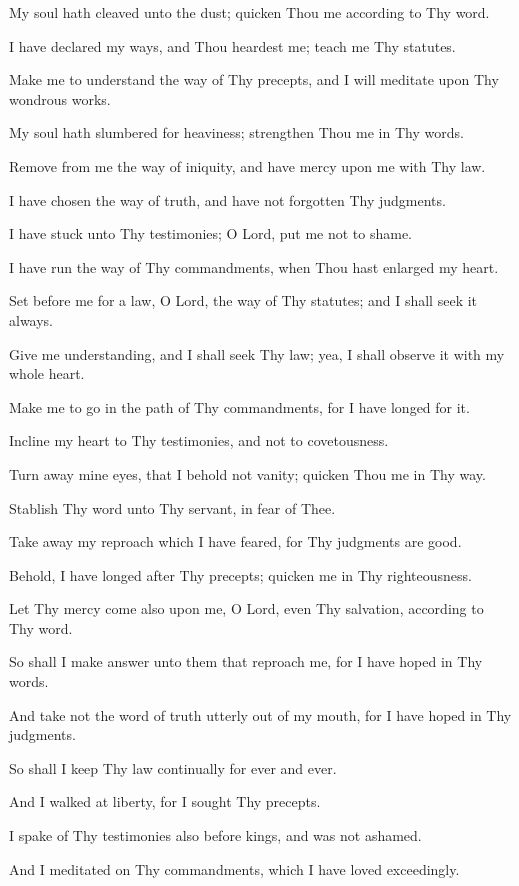 My soul hath cleaved unto the dust; quicken Thou me
according to Thy word.

I have declared my ways, and Thou heardest me; teach me
Thy statutes.

Make me to understand the way of Thy precepts, and I will
meditate upon Thy wondrous works.

My soul hath slumbered for heaviness; strengthen Thou me in
Thy words.

Remove from me the way of iniquity, and have mercy upon me
with Thy law.

I have chosen the way of truth, and have not forgotten Thy
judgments.

I have stuck unto Thy testimonies; O Lord, put me not to
shame.

I have run the way of Thy commandments, when Thou hast
enlarged my heart.

Set before me for a law, O Lord, the way of Thy statutes; and I
shall seek it always.

Give me understanding, and I shall seek Thy law; yea, I shall
observe it with my whole heart.

Make me to go in the path of Thy commandments, for I have
longed for it.

Incline my heart to Thy testimonies, and not to covetousness.

Turn away mine eyes, that I behold not vanity; quicken Thou
me in Thy way.

Stablish Thy word unto Thy servant, in fear of Thee.

Take away my reproach which I have feared, for Thy
judgments are good.

Behold, I have longed after Thy precepts; quicken me in Thy
righteousness.

Let Thy mercy come also upon me, O Lord, even Thy salvation,
according to Thy word.

So shall I make answer unto them that reproach me, for I have
hoped in Thy words.

And take not the word of truth utterly out of my mouth, for I
have hoped in Thy judgments.

So shall I keep Thy law continually for ever and ever.

And I walked at liberty, for I sought Thy precepts.

I spake of Thy testimonies also before kings, and was not
ashamed.

And I meditated on Thy commandments, which I have loved
exceedingly.

